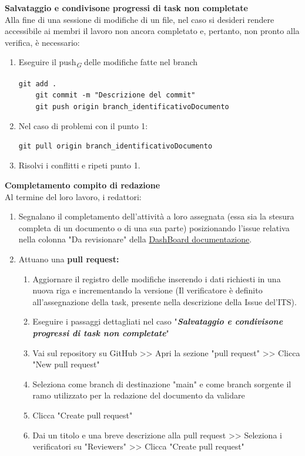 \documentclass{article}
\begin{document}
     \textbf{Salvataggio e condivisone progressi di task non completate}\\
    Alla fine di una sessione di modifiche di un file, nel caso si desideri rendere accessibile ai membri il lavoro non ancora completato e, pertanto, non pronto alla verifica, è necessario:
    \begin{enumerate}
        \item Eseguire il push\textsubscript{\textit{G}}  delle modifiche fatte nel branch 
        \begin{lstlisting}[style=code]
    git add .
    git commit -m "Descrizione del commit"
    git push origin branch_identificativoDocumento
        \end{lstlisting}

        \item Nel caso di problemi con il punto 1:
        \begin{lstlisting}[style=code]
   git pull origin branch_identificativoDocumento
        \end{lstlisting}
        \item Risolvi i conflitti e ripeti punto 1.
    \end{enumerate}
\vspace{0.3cm}
     \textbf{Completamento compito di redazione}\\
    Al termine del loro lavoro, i redattori:
    \begin{enumerate}
        \item Segnalano il completamento dell'attività a loro assegnata (essa sia la stesura completa di un documento o di una sua parte) posizionando l'issue relativa nella colonna "Da revisionare" della  \href{https://github.com/orgs/ByteOps-swe/projects/1/views/1}{DashBoard documentazione}.
        \item Attuano una \textbf{pull request:}
        \begin{enumerate}
     \item Aggiornare il registro delle modifiche inserendo i dati richiesti in  una nuova riga e incrementando la versione (Il verificatore è definito all'assegnazione della task, presente nella descrizione della Issue del'ITS).
        \item Eseguire i passaggi dettagliati nel caso "\textit{\textbf{Salvataggio e condivisone progressi di task non completate}}"
        \item Vai sul repository su GitHub >> Apri la sezione "pull request" >> Clicca "New pull request"
        \item Seleziona come branch di destinazione "main" e come branch sorgente il ramo utilizzato per la redazione del documento da validare
        \item Clicca "Create pull request"
        \item Dai un titolo e una breve descrizione alla pull request >> Seleziona i verificatori su "Reviewers" >> Clicca "Create pull request"
    \end{enumerate}
    \end{enumerate}
    
\end{document}
